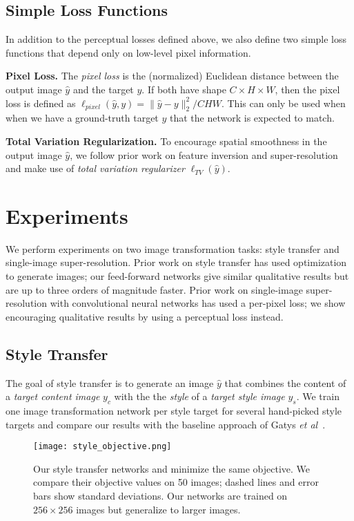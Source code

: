 \documentclass[runningheads]{llncs}
\newcommand{\etal}{\textit{et al}}
\begin{document}
\subsection{Simple Loss Functions}
In addition to the perceptual losses defined above, we also define two simple loss functions
that depend only on low-level pixel information.

\vspace{1mm}
\noindent \textbf{Pixel Loss.}
The \emph{pixel loss} is the (normalized) Euclidean distance between the output image
$\hat y$ and the target $y$. If both have shape $C\times H\times W$, then the pixel loss is
defined as $\ell_{pixel}(\hat y, y) = \|\hat y - y\|^2_2 / CHW$. This can only be used
when when we have a ground-truth target $y$ that the network is expected to match.


\vspace{1mm}
\noindent\textbf{Total Variation Regularization.}
To encourage spatial smoothness in the output image $\hat y$, we
follow prior work on feature inversion \cite{mahendran15understanding,d2012beyond}
and super-resolution~\cite{aly2005image,zhang2010non} and make use of
\emph{total variation regularizer} $\ell_{TV}(\hat y)$.


\section{Experiments}
We perform experiments on two image transformation tasks: style transfer and single-image
super-resolution. Prior work on style transfer has used optimization to generate images;
our feed-forward networks give similar qualitative results but are up to three orders of
magnitude faster. Prior work on single-image super-resolution with convolutional neural
networks has used a per-pixel loss; we show encouraging qualitative results by using
a perceptual loss instead.

\subsection{Style Transfer}
\label{sec:style}
The goal of style transfer is to generate an image $\hat y$ that combines the content of
a \emph{target content image} $y_c$ with the the \emph{style} of a \emph{target style image}
$y_s$. We train one image transformation network per style target for several hand-picked
style targets and compare our results with the baseline approach of
Gatys \etal~\cite{gatys2015neural}.

\begin{figure}[t]
  \centering
  \texttt{[image: style\_objective.png]}
  \vspace{-4mm}
  \caption{Our style transfer networks and \cite{gatys2015neural} minimize the same objective.
    We compare their objective values on 50 images; dashed lines and error bars show standard
    deviations. Our networks are trained on $256\times256$ images but generalize to larger images.
  }
  \label{fig:style-loss}
  \vspace{-6mm}
\end{figure}
\end{document}
